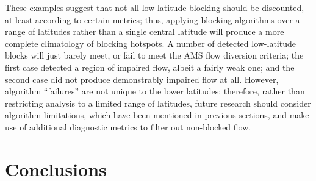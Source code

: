 \documentclass[smallextended]{svjour3}       %
\numberwithin{equation}{section}
\begin{document}
These examples suggest that not all low-latitude blocking should be discounted, at least according to certain metrics; thus, applying blocking algorithms over a range of latitudes rather than a single central latitude will produce a more complete climatology of blocking hotspots. A number of detected low-latitude blocks will just barely meet, or fail to meet the AMS flow diversion criteria; the first case detected a region of impaired flow, albeit a fairly weak one; and the second case did not produce demonstrably impaired flow at all. However, algorithm ``failures'' are not unique to the lower latitudes; therefore, rather than restricting analysis to a limited range of latitudes, future research should consider algorithm limitations, which have been mentioned in previous sections, and make use of additional diagnostic metrics to filter out non-blocked flow. 

\section{Conclusions}\label{concsec}
\end{document}
